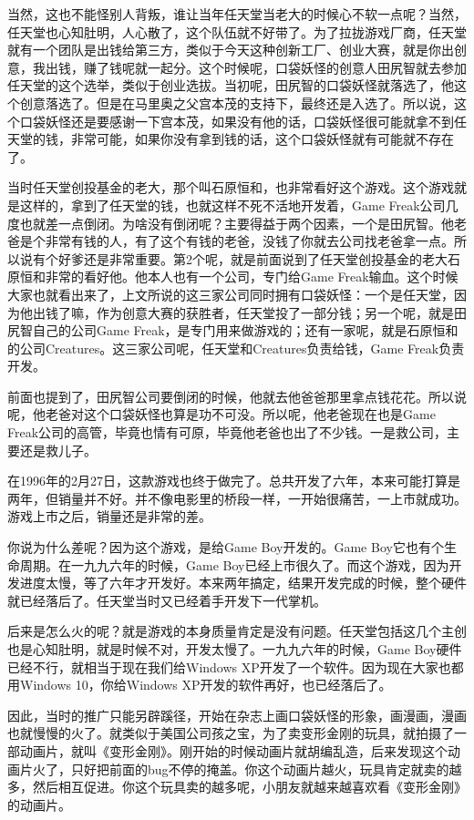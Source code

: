 \documentclass[
  letterpaper,
  DIV=11,
  numbers=noendperiod]{scrreprt}
\begin{document}
当然，这也不能怪别人背叛，谁让当年任天堂当老大的时候心不软一点呢？当然，任天堂也心知肚明，人心散了，这个队伍就不好带了。为了拉拢游戏厂商，任天堂就有一个团队是出钱给第三方，类似于今天这种创新工厂、创业大赛，就是你出创意，我出钱，赚了钱呢就一起分。这个时候呢，口袋妖怪的创意人田尻智就去参加任天堂的这个选举，类似于创业选拔。当初呢，田尻智的口袋妖怪就落选了，他这个创意落选了。但是在马里奥之父宫本茂的支持下，最终还是入选了。所以说，这个口袋妖怪还是要感谢一下宫本茂，如果没有他的话，口袋妖怪很可能就拿不到任天堂的钱，非常可能，如果你没有拿到钱的话，这个口袋妖怪就有可能就不存在了。

当时任天堂创投基金的老大，那个叫石原恒和，也非常看好这个游戏。这个游戏就是这样的，拿到了任天堂的钱，也就这样不死不活地开发着，Game
Freak公司几度也就差一点倒闭。为啥没有倒闭呢？主要得益于两个因素，一个是田尻智。他老爸是个非常有钱的人，有了这个有钱的老爸，没钱了你就去公司找老爸拿一点。所以说有个好爹还是非常重要。第2个呢，就是前面说到了任天堂创投基金的老大石原恒和非常的看好他。他本人也有一个公司，专门给Game
Freak输血。这个时候大家也就看出来了，上文所说的这三家公司同时拥有口袋妖怪：一个是任天堂，因为他出钱了嘛，作为创意大赛的获胜者，任天堂投了一部分钱；另一个呢，就是田尻智自己的公司Game
Freak，是专门用来做游戏的；还有一家呢，就是石原恒和的公司Creatures。这三家公司呢，任天堂和Creatures负责给钱，Game
Freak负责开发。

前面也提到了，田尻智公司要倒闭的时候，他就去他爸爸那里拿点钱花花。所以说呢，他老爸对这个口袋妖怪也算是功不可没。所以呢，他老爸现在也是Game
Freak公司的高管，毕竟也情有可原，毕竟他老爸也出了不少钱。一是救公司，主要还是救儿子。

在1996年的2月27日，这款游戏也终于做完了。总共开发了六年，本来可能打算是两年，但销量并不好。并不像电影里的桥段一样，一开始很痛苦，一上市就成功。游戏上市之后，销量还是非常的差。

你说为什么差呢？因为这个游戏，是给Game Boy开发的。Game
Boy它也有个生命周期。在一九九六年的时候，Game
Boy已经上市很久了。而这个游戏，因为开发进度太慢，等了六年才开发好。本来两年搞定，结果开发完成的时候，整个硬件就已经落后了。任天堂当时又已经着手开发下一代掌机。

后来是怎么火的呢？就是游戏的本身质量肯定是没有问题。任天堂包括这几个主创也是心知肚明，就是时候不对，开发太慢了。一九九六年的时候，Game
Boy硬件已经不行，就相当于现在我们给Windows
XP开发了一个软件。因为现在大家也都用Windows 10，你给Windows
XP开发的软件再好，也已经落后了。

因此，当时的推广只能另辟蹊径，开始在杂志上画口袋妖怪的形象，画漫画，漫画也就慢慢的火了。就类似于美国公司孩之宝，为了卖变形金刚的玩具，就拍摄了一部动画片，就叫《变形金刚》。刚开始的时候动画片就胡编乱造，后来发现这个动画片火了，只好把前面的bug不停的掩盖。你这个动画片越火，玩具肯定就卖的越多，然后相互促进。你这个玩具卖的越多呢，小朋友就越来越喜欢看《变形金刚》的动画片。
\end{document}
